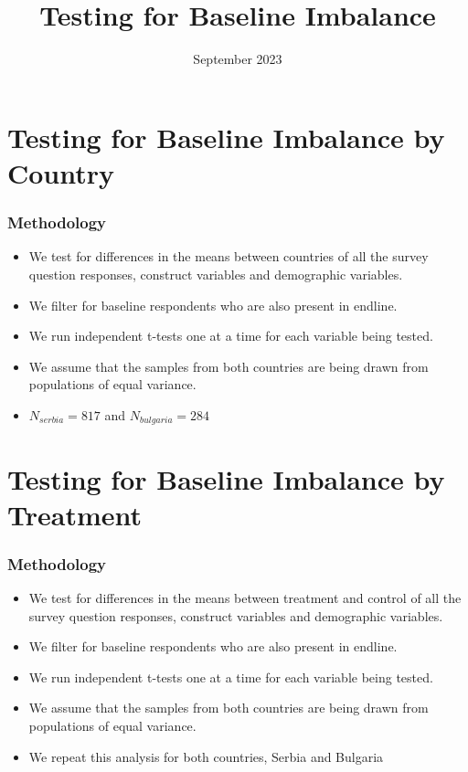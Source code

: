 \documentclass{article}
\title{Testing for Baseline Imbalance}
\date{September 2023}
\begin{document}
\section*{Testing for Baseline Imbalance by Country}
\subsubsection*{Methodology}
\begin{itemize}
    \item We test for differences in the means between countries of all the survey question responses, construct variables and demographic variables.
    \item We filter for baseline respondents who are also present in endline.
    \item We run independent t-tests one at a time for each variable being tested.
    \item We assume that the samples from both countries are being drawn from populations of equal variance.
    \item $N_{serbia} = 817$ and $N_{bulgaria} = 284$
\end{itemize}






\section*{Testing for Baseline Imbalance by Treatment}
\subsubsection*{Methodology}

\begin{itemize}
    \item We test for differences in the means between treatment and control of all the survey question responses, construct variables and demographic variables.
    \item We filter for baseline respondents who are also present in endline.
    \item We run independent t-tests one at a time for each variable being tested.
    \item We assume that the samples from both countries are being drawn from populations of equal variance.
    \item We repeat this analysis for both countries, Serbia and Bulgaria
\end{itemize}





\end{document}

